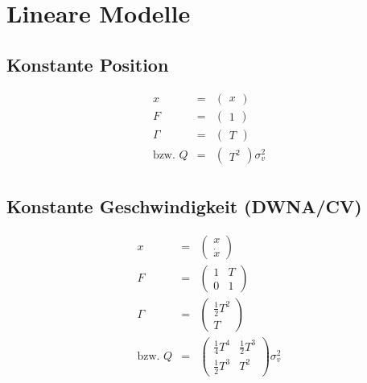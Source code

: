 \section{Lineare Modelle}
\subsection{Konstante Position}
\begin{eqnarray*}
    x &=& \begin{pmatrix} x\end{pmatrix} \\
    F &=& \begin{pmatrix} 1\end{pmatrix} \\
    \Gamma &=& \begin{pmatrix} T \end{pmatrix} \\
    \text{bzw. } Q &=& 
        \begin{pmatrix} 
            T^2 
        \end{pmatrix}
        \sigma^2_v \\
\end{eqnarray*}

\subsection{Konstante Geschwindigkeit (DWNA/CV)}
\begin{eqnarray*}
    x &=& \begin{pmatrix} x \\ \dot{x} \end{pmatrix} \\
    F &=& \begin{pmatrix} 1 & T \\ 0 & 1 \end{pmatrix} \\
    \Gamma &=& \begin{pmatrix} \frac{1}{2} T^2 \\ T \end{pmatrix} \\
    \text{bzw. } Q &=& 
        \begin{pmatrix} 
            \frac{1}{4} T^4 & \frac{1}{2} T^3 \\ 
            \frac{1}{2} T^3 & T^2 
        \end{pmatrix}
        \sigma^2_v \\
\end{eqnarray*}

